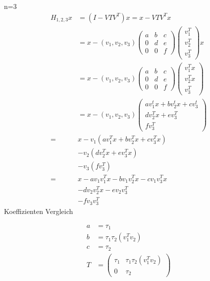n=3
\begin{align*}
  H_{1,2,3} x &= (I - V T V^T) x = x - V T V^T x\\
  &= x - (v_1, v_2, v_3)
  \begin{pmatrix}
    a & b & c\\ 
    0 & d & e\\
    0 & 0 & f
  \end{pmatrix}
  \begin{pmatrix}
    v_1^T \\ v_2^T \\ v_3^T
  \end{pmatrix}
  x\\
  &= x - (v_1, v_2, v_3)
  \begin{pmatrix}
    a & b & c\\ 
    0 & d & e\\
    0 & 0 & f
  \end{pmatrix}
  \begin{pmatrix}
    v_1^T x \\ v_2^T x \\ v_3^T
  \end{pmatrix}\\
  &= x - (v_1, v_2, v_3)
  \begin{pmatrix}
    a v_1^t x + b v_2^t x + c v_3^t\\ 
    d v_2^T x + e v_3^T \\
    f v_3^T
  \end{pmatrix}\\
  =& x - v_1(a v_1^T x + b v_2^T x + c v_3^T x) \\ 
   & - v_2 ( d v_2^T x + e v_3^T x) \\ 
   & - v_3 ( f v_3^T ) \\
  =& x - a v_1 v_1^T x - b v_1 v_2^T x - c v_1 v_3^T x \\
   & - d v_2 v_2^T x - e v_2 v_3^T \\
   & - f v_3 v_3^T
\end{align*}
Koeffizienten Vergleich

\begin{align*}
  a &= \tau_1 \\
	b &= \tau_1 \tau_2 (v_1^T v_2) \\
	c &= \tau_2 \\
  T &=
  \begin{pmatrix}
    \tau_1 & \tau_1 \tau_2 (v_1^T v_2)\\ 0 & \tau_2
  \end{pmatrix}
\end{align*}

